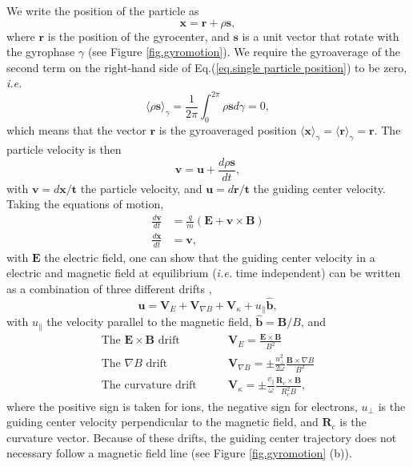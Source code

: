 \documentclass[my_thesis.tex]{subfiles}
\begin{document}
We write the position of the particle as
\begin{equation}
    \mathbf{x} = \mathbf{r} + \rho\mathbf{s},\label{eq.single particle position}
\end{equation}
where $\mathbf{r}$ is the position of the gyrocenter, and $\mathbf{s}$ is a unit vector that rotate with the gyrophase $\gamma$ (see Figure \ref{fig.gyromotion}). We require the gyroaverage of the second term on the right-hand side of Eq.(\ref{eq.single particle position}) to be zero, \textit{i.e.}
\begin{equation}
    \langle \rho\mathbf{s}\rangle_\gamma = \frac{1}{2\pi}\int_0^{2\pi} \rho\mathbf{s}d\gamma = 0,
\end{equation}
which means that the vector $\mathbf{r}$ is the gyroaveraged position $\langle\mathbf{x}\rangle_\gamma = \langle\mathbf{r}\rangle_\gamma = \mathbf{r}$. The particle velocity is then
\begin{equation}
    \mathbf{v} = \mathbf{u} + \frac{d\rho\mathbf{s}}{dt},
\end{equation}
with $\mathbf{v}=d\mathbf{x}/\mathbf{t}$ the particle velocity, and $\mathbf{u}=d\mathbf{r}/\mathbf{t}$ the guiding center velocity. Taking the equations of motion,
\begin{align}
    \frac{d\mathbf{v}}{dt} &= \frac{q}{m}(\mathbf{E}+\mathbf{v}\times\mathbf{B})\\
    \frac{d\mathbf{x}}{dt} &= \mathbf{v},
\end{align}
with $\mathbf{E}$ the electric field, one can show that the guiding center velocity in a electric and magnetic field at equilibrium (\textit{i.e.} time independent) can be written as a combination of three different drifts \citep{freidberg_2007},
\begin{equation}
    \mathbf{u} = \mathbf{V}_E + \mathbf{V}_{\nabla B} + \mathbf{V}_\kappa + u_\parallel \hat{\mathbf{b}},
\end{equation}
with $u_\parallel$ the velocity parallel to the magnetic field, $\hat{\mathbf{b}}=\mathbf{B}/B$, and
\begin{align}
    \text{The $\mathbf{E}\times\mathbf{B}$ drift}\qquad &\mathbf{V}_E = \frac{\mathbf{E}\times\mathbf{B}}{B^2}\\
    \text{The $\nabla B$ drift}\qquad &\mathbf{V}_{\nabla B} = \pm \frac{u_\perp^2}{2\omega}\frac{\mathbf{B}\times\nabla B}{B^2}\\
    \text{The curvature drift}\qquad &\mathbf{V}_\kappa = \pm \frac{v_\parallel}{\omega}\frac{\mathbf{R}_c\times\mathbf{B}}{R_c^2 B},
\end{align}
where the positive sign is taken for ions, the negative sign for electrons, $u_\perp$ is the guiding center velocity perpendicular to the magnetic field, and $\mathbf{R}_c$ is the curvature vector. Because of these drifts, the guiding center trajectory does not necessary follow a magnetic field line (see Figure \ref{fig.gyromotion} (b)).
\end{document}
